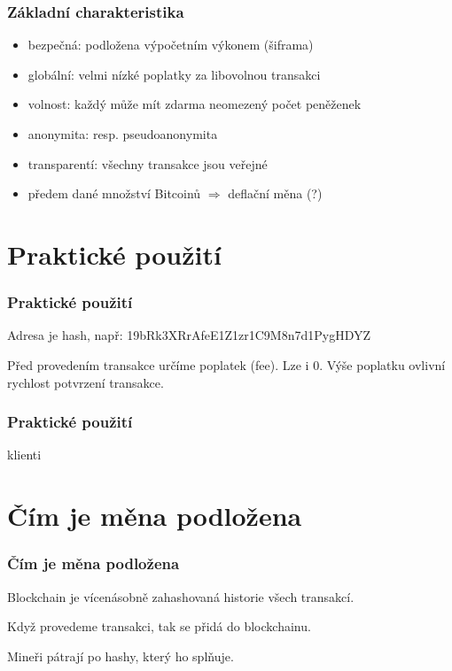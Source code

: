\documentclass[xetex]{beamer}
\begin{document}
\begin{frame}
 	\frametitle{Základní charakteristika}
	\begin{itemize}
		\item bezpečná: podložena výpočetním výkonem (šiframa)
		\item globální: velmi nízké poplatky za libovolnou transakci
		\item volnost: každý může mít zdarma neomezený počet peněženek
		\item anonymita: resp. pseudoanonymita
		\item transparentí: všechny transakce jsou veřejné
		\item předem dané množství Bitcoinů $\Rightarrow$ deflační měna (?)
	\end{itemize}
\end{frame}

\section{Praktické použití}

\begin{frame}
	\frametitle{Praktické použití}
	Adresa je hash, např: 19bRk3XRrAfeE1Z1zr1C9M8n7d1PygHDYZ

	\bigskip

	Před provedením transakce určíme poplatek (fee). Lze i 0. Výše poplatku ovlivní rychlost potvrzení transakce.
\end{frame}

\begin{frame}
 \frametitle{Praktické použití}
	klienti
\end{frame}

\section{Čím je měna podložena}

\begin{frame}
	\frametitle{Čím je měna podložena}

	Blockchain je vícenásobně zahashovaná historie všech transakcí. 

	\bigskip

	Když provedeme transakci, tak se přidá do blockchainu. 

	\bigskip

	Mineři pátrají po hashy, který ho splňuje.
\end{frame}
\end{document}
